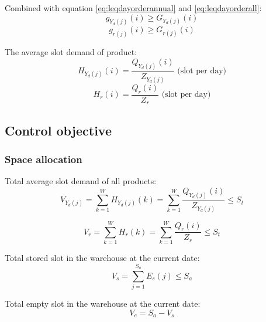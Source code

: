     Combined with equation \eqref{eq:leqdayorderannual} and \eqref{eq:leqdayorderall}:
    \begin{equation}\label{eq:geqgYd}
        g_{Y_d(j)}(i) \geq G_{Y_d(j)}(i)
    \end{equation}
    \begin{equation}\label{eq:geqgr}
        g_{r(j)}(i) \geq G_{r(j)}(i)
    \end{equation}

    The average slot demand of product:
    \begin{equation}\label{eq:HYd}
        H_{Y_d(j)}(i) = \frac{Q_{Y_d(j)}(i)}{Z_{Y_d(j)}}
        \text{ (slot per day)}
    \end{equation}
    \begin{equation}\label{eq:Hr}
        H_r(i) = \frac{Q_r(i)}{Z_r}
        \text{ (slot per day)}
    \end{equation}

\subsection{Control objective}

\subsubsection{Space allocation}

    Total average slot demand of all products:
    \begin{equation}\label{eq:VYd}
        V_{Y_d(j)} = \sum_{k=1}^{W} H_{Y_d(j)}(k) 
        = \sum_{k=1}^{W} \frac{Q_{Y_d(j)}(i)}{Z_{Y_d(j)}}
        \leq S_t
    \end{equation}
    
    \begin{equation}\label{eq:Vr}
        V_r = \sum_{k=1}^{W} H_r(k) 
        = \sum_{k=1}^{W} \frac{Q_{r}(i)}{Z_{r}}
        \leq S_t
    \end{equation}

    Total stored slot in the warehouse at the current date:
    \begin{equation}\label{eq:Vs}
        V_s = \sum_{j=1}^{S_a} E_s(j) \leq S_a
    \end{equation}

    Total empty slot in the warehouse at the current date:
    \begin{equation}\label{eq:Ve}
        V_e = S_a - V_s
    \end{equation}

